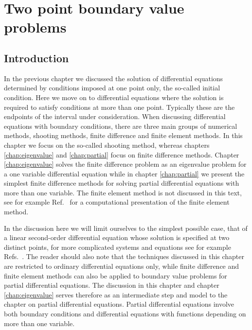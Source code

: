 
\chapter{Two point boundary value problems}\label{chap:twop}
%


\section{Introduction}
%

In the previous chapter we discussed the solution of differential equations
determined by conditions imposed at one point only, the so-called initial condition. 
Here we move on to differential
equations where the solution is required to satisfy conditions at more than one point.
Typically these are the endpoints of the interval under consideration. 
When discussing differential equations with boundary conditions, there are three main groups
of numerical methods, shooting methods, finite difference and finite element methods.
In this chapter we focus on the so-called shooting method, whereas chapters 
\ref{chap:eigenvalue} and \ref{chap:partial} focus on finite difference methods. Chapter 
\ref{chap:eigenvalue} solves the finite difference problem as an eigenvalue problem for a one
variable differential equation while 
in chapter \ref{chap:partial} we present the simplest finite difference methods for 
solving partial differential equations with more than one variable.
The finite element method is not discussed in this text, 
see for example Ref.~\cite{langtangen1999} for a computational presentation of the finite element 
method.

In the discussion here we will limit ourselves to the simplest possible case, that of 
a linear second-order differential equation whose solution is specified at two distinct points,
for more complicated systems and equations see for example Refs.~\cite{ortega1981,tveito2002}.
The reader should also note that the techniques discussed in this chapter are restricted 
to ordinary differential equations only, while finite difference and finite element methods 
can also be applied to boundary value problems for partial differential equations.  
 The discussion in this  chapter and chapter \ref{chap:eigenvalue} 
serves therefore as an intermediate step and model to the chapter
on partial differential equations. Partial differential 
equations involve both boundary conditions and differential
equations with functions depending on more than 
one variable. 


